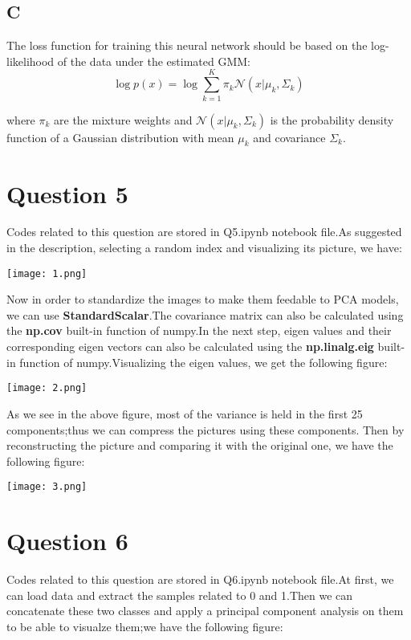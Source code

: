\documentclass{article}
\begin{document}
\subsection*{C}
The loss function for training this neural network should be based on the log-likelihood of the data under the estimated GMM:
\begin{equation*}
    \log{p(x)} = \log{\sum_{k=1}^{K} \pi_k \mathcal{N}(x|\mu_k, \Sigma_k)}
\end{equation*}

where $\pi_k$ are the mixture weights and $\mathcal{N}(x|\mu_k, \Sigma_k)$ is the probability density function of a Gaussian distribution with mean
$\mu_k$ and covariance $\Sigma_k$.

\section*{Question 5}
Codes related to this question are stored in Q5.ipynb notebook file.As suggested in the description, selecting a random index 
and visualizing its picture, we have:

\texttt{[image: 1.png]}

Now in order to standardize the images to make them feedable to PCA models, we can use \textbf{StandardScalar}.The covariance matrix can also be
calculated using the \textbf{np.cov} built-in function of numpy.In the next step, eigen values and their corresponding eigen vectors
can also be calculated using the \textbf{np.linalg.eig} built-in function of numpy.Visualizing the eigen values, we get the following figure:

\texttt{[image: 2.png]}

As we see in the above figure, most of the variance is held in the first 25 components;thus we can compress the pictures using these components.
Then by reconstructing the picture and comparing it with the original one, we have the following figure:

\texttt{[image: 3.png]}

\section*{Question 6}
Codes related to this question are stored in Q6.ipynb notebook file.At first, we can load data and extract the samples related to 0 and 1.Then
we can concatenate these two classes and apply a principal component analysis on them to be able to visualze them;we have the following figure:
\end{document}
